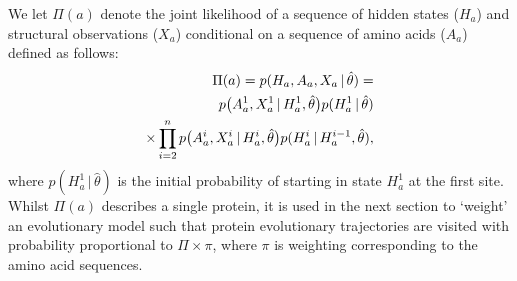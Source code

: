 \documentclass[nogrid]{MBE}%
\begin{document}
We let $\Pi(a)$ denote the joint likelihood of a sequence of hidden states ($H_a$) and structural observations ($X_a$) conditional on a sequence of amino acids ($A_a$)  defined as follows:
\begin{align}
\label{eq:proteinlikelihood}
\Pi(a) = p(H_{a},A_{a},X_{a}\,|\,\hat{\theta}) = \notag \\
 p\big(A_{a}^{1},X_{a}^{1}\,|\,H_{a}^{1},\hat{\theta}\big)p(H_{a}^{1}\,|\,\hat{\theta})\notag \\
\times \prod_{i=2}^n p\big(A_{a}^{i},X_{a}^{i}\,|\,H_{a}^{i},\hat{\theta}\big)p(H_{a}^{i}\,|\,H_{a}^{i-1},\hat{\theta}),
\end{align}
where $p(H_{a}^{1}\,|\,\hat{\theta})$ is the initial probability of starting in state $H_{a}^{1}$ at the first site. Whilst  $\Pi(a)$ describes a single protein, it is used in the next section to `weight' an evolutionary model such that protein evolutionary trajectories are visited with probability proportional to $\Pi\times{\pi}$, where $\pi$ is weighting corresponding to the amino acid sequences.

\end{document}
